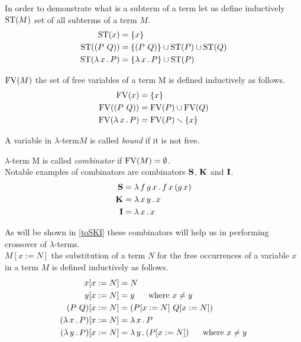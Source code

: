 \documentclass[12pt,a4paper]{report}
\newcommand{\lets}{let us\xspace}
\newcommand{\lterm}{$\lambda$-term\xspace}
\newcommand{\lterms}{$\lambda$-terms\xspace}
\begin{document}
In order to demonstrate what is a subterm of a term
\lets define inductively $\mathop{\mathrm{ST}}(M)$ set of all subterms of a term $M$.
\begin{align*}
\mathop{\mathrm{ST}}(x)          &= \{x\} \\
\mathop{\mathrm{ST}}((P~Q))      &= \{(P~Q)\} \cup \mathop{\mathrm{ST}}(P) \cup \mathop{\mathrm{ST}}(Q) \\
\mathop{\mathrm{ST}}(\lambda \, x \, . \, P) &= \{\lambda \, x \, . \, P\} \cup \mathop{\mathrm{ST}}(P) 
\end{align*}

 
$\mathop{\mathrm{FV}}(M)$ the set of free variables of a term M is defined inductively as follows.
\begin{align*}
\mathop{\mathrm{FV}}(x)          &= \{x\} \\
\mathop{\mathrm{FV}}((P~Q))      &= \mathop{\mathrm{FV}}(P) \cup \mathop{\mathrm{FV}}(Q) \\
\mathop{\mathrm{FV}}(\lambda \, x \, . \, P) &= \mathop{\mathrm{FV}}(P) \smallsetminus \{x\}
\end{align*}

A variable in \lterm $M$ is called \textit{bound} if it is not free.

\lterm M is called \textit{combinator} if $\mathop{\mathrm{FV}}(M)=\emptyset$.\\


Notable examples of combinators are combinators
$\mathbf{S}$, $\mathbf{K}$ and $\mathbf{I}$.
\begin{align*}
\mathbf{S} &= \lambda \, f\,g\,x \, . \, f\,x\,(g\,x) \\
\mathbf{K} &= \lambda \, x\,y \, . \, x \\
\mathbf{I} &= \lambda \, x \, . \, x 
\end{align*}

As will be shown in \ref{toSKI}
these combinators will help us in performing crossover of \lterms.\\

$M[x:=N]$ the substitution of a term $N$ for the free occurrences of 
a variable $x$ in a term $M$ is defined inductively as follows.
\begin{align*}
x[x:=N]           &= N \\
y[x:=N]           &= y \text{ ~~~~where } x \not= y  \\
(P~Q)[x:=N]       &= ( P[x:=N]  ~ Q[x:=N] ) \\
( \lambda \, x \, . \, P )[x:=N] &= \lambda \, x \, . \, P\\
( \lambda \, y \, . \, P )[x:=N] &= \lambda \, y \, . \, ( P[x:=N] ) \text{ ~~~~where } x \not= y
\end{align*}
\end{document}
